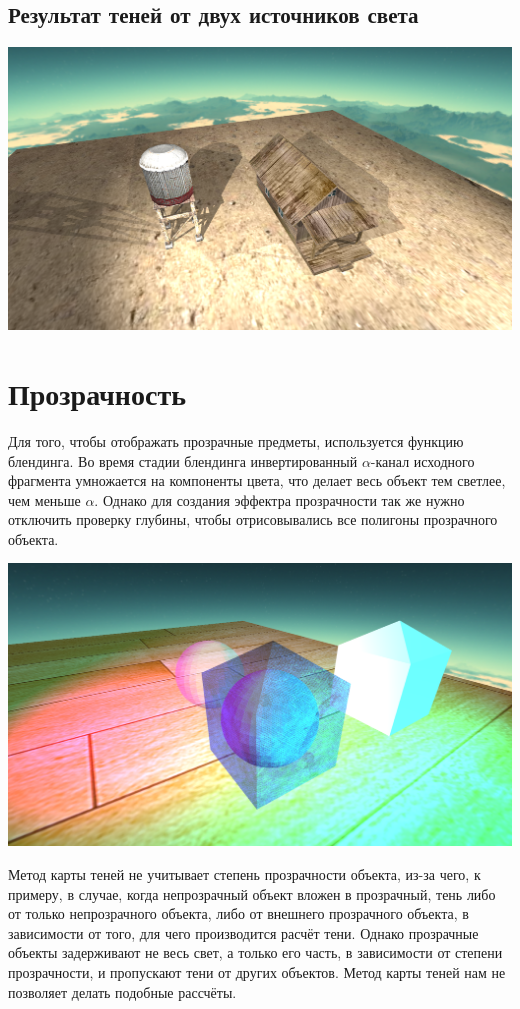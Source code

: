 \documentclass[12pt, a4paper] {ncc}
\begin{document}
	\subsection{Результат теней от двух источников света}

		\includegraphics[scale=0.3]{./scene.png}

\section{Прозрачность}

	Для того, чтобы отображать прозрачные предметы, используется функцию блендинга. Во время
	стадии блендинга инвертированный $\alpha$-канал исходного фрагмента
	умножается на компоненты цвета, что делает весь объект тем светлее, чем меньше $\alpha$.
	Однако для создания эффектра прозрачности так же нужно отключить проверку глубины, чтобы
	отрисовывались все полигоны прозрачного объекта.

	\includegraphics[scale=0.3]{./scene_transp.png}

	Метод карты теней не учитывает степень прозрачности объекта, из-за чего, к примеру,
	в случае, когда непрозрачный объект вложен в прозрачный, тень либо от только непрозрачного 
	объекта, либо от внешнего прозрачного объекта, в зависимости от того, для чего производится
	расчёт тени. Однако прозрачные объекты задерживают не весь свет, а только
	его часть, в зависимости от степени прозрачности, и пропускают тени от других объектов.
	Метод карты теней нам не позволяет делать подобные рассчёты.
\end{document}
